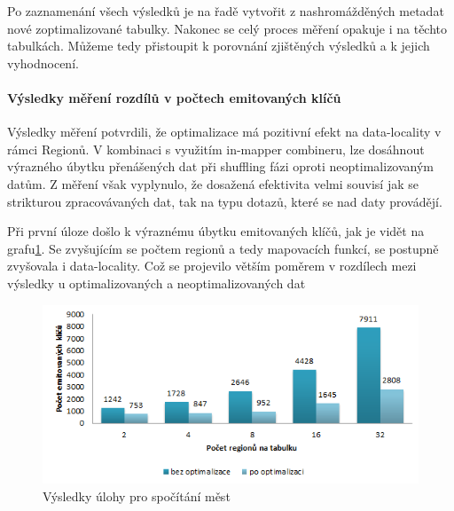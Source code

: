 \documentclass[thesis=M,czech]{FITthesis}[2012/06/26]
\begin{document}
Po zaznamenání všech výsledků je na řadě vytvořit z nashromážděných metadat nové zoptimalizované tabulky. Nakonec se celý proces měření opakuje i na těchto tabulkách. Můžeme tedy přistoupit k porovnání zjištěných výsledků a k jejich vyhodnocení.

\paragraph{Výsledky měření rozdílů v počtech emitovaných klíčů}
Výsledky měření potvrdili, že optimalizace má pozitivní efekt na data-locality v rámci Regionů. V kombinaci s využitím in-mapper combineru, lze dosáhnout výrazného úbytku přenášených dat při shuffling fázi oproti neoptimalizovaným datům. Z měření však vyplynulo, že dosažená efektivita velmi souvisí jak se strikturou zpracovávaných dat, tak na typu dotazů, které se nad daty provádějí.

Při první úloze došlo k výraznému úbytku emitovaných klíčů, jak je vidět na grafu\ref{fig:mesta}. Se zvyšujícím se počtem regionů a tedy mapovacích funkcí, se postupně zvyšovala i data-locality. Což se projevilo větším poměrem v rozdílech mezi výsledky u optimalizovaných a neoptimalizovaných dat

\begin{figure}[h]\centering
	\includegraphics[width=1\textwidth, angle=0]{files/mesta}
	\caption[Výsledky úlohy pro spočítání měst]
	{Výsledky úlohy pro spočítání měst}\label{fig:mesta}
\end{figure}
\end{document}

